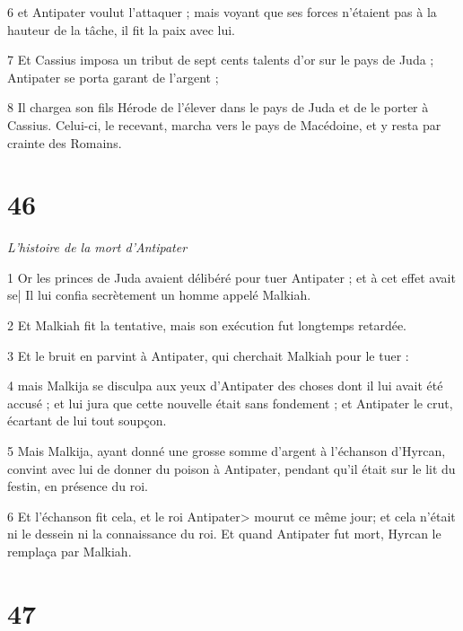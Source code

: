 \par 6 et Antipater voulut l'attaquer ; mais voyant que ses forces n'étaient pas à la hauteur de la tâche, il fit la paix avec lui.

\par 7 Et Cassius imposa un tribut de sept cents talents d'or sur le pays de Juda ; Antipater se porta garant de l'argent ;

\par 8 Il chargea son fils Hérode de l'élever dans le pays de Juda et de le porter à Cassius. Celui-ci, le recevant, marcha vers le pays de Macédoine, et y resta par crainte des Romains.

\chapter{46}

\par \textit{L'histoire de la mort d'Antipater}

\par 1 Or les princes de Juda avaient délibéré pour tuer Antipater ; et à cet effet avait se| Il lui confia secrètement un homme appelé Malkiah.

\par 2 Et Malkiah fit la tentative, mais son exécution fut longtemps retardée.

\par 3 Et le bruit en parvint à Antipater, qui cherchait Malkiah pour le tuer :

\par 4 mais Malkija se disculpa aux yeux d'Antipater des choses dont il lui avait été accusé ; et lui jura que cette nouvelle était sans fondement ; et Antipater le crut, écartant de lui tout soupçon.

\par 5 Mais Malkija, ayant donné une grosse somme d'argent à l'échanson d'Hyrcan, convint avec lui de donner du poison à Antipater, pendant qu'il était sur le lit du festin, en présence du roi.

\par 6 Et l'échanson fit cela, et le roi Antipater> mourut ce même jour; et cela n'était ni le dessein ni la connaissance du roi. Et quand Antipater fut mort, Hyrcan le remplaça par Malkiah.

\chapter{47}

